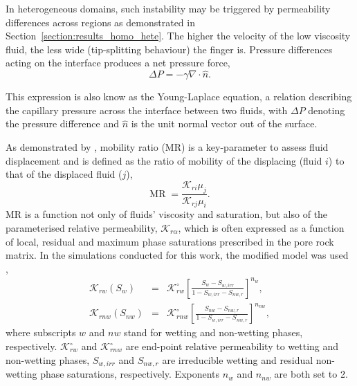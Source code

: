 \documentclass[preprint,authoryear,12pt]{elsarticle}
\newcommand{\frc}{\displaystyle\frac}
\begin{document}
\medskip 
In heterogeneous domains, such instability may be triggered by permeability differences across regions as demonstrated in Section~\ref{section:results_homo_hete}. The higher the velocity of the low viscosity fluid, the less wide (tip-splitting behaviour) the finger is. Pressure differences acting on the interface produces a net pressure force,      
\begin{equation} 
\Delta P= - \gamma \nabla\cdot\hat{n}. 
\label{eq:pressure_dif} 
\end{equation}

\noindent This expression is also know as the Young-Laplace equation, a relation describing the capillary pressure across the interface between two fluids, with $\Delta P$ denoting the pressure difference and $\hat{n}$ is the unit normal vector out of the surface. 

\medskip
As demonstrated by \citet{habermann_1960} \citep[see also][]{budek_2017}, mobility ratio (MR) is a key-parameter to assess fluid displacement and is defined as the ratio of mobility of the displacing (fluid $i$) to that of the displaced fluid ($j$),
\begin{equation}
 \text{MR} \; = \frac{\mathcal{K}_{ri} \mu_{j}}{\mathcal{K}_{rj} \mu_{i}}. 
\label{eq:MR}
\end{equation}
MR is a function not only of fluids' viscosity and saturation, but also of the parameterised relative permeability, $\mathcal{K}_{r\alpha}$, which is often expressed as a function of local, residual and maximum phase saturations prescribed in the pore rock matrix. In the simulations conducted for this work, the modified \cite{Brooks_1964} model was used \citep{alpak_1999},
\begin{eqnarray}
  \mathcal{K}_{rw}\left(S_{w}\right) &=& \mathcal{K}^{\circ}_{rw}\left[\frc{S_{w}-S_{w,irr}}{1-S_{w,irr}-S_{nw,r}}\right]^{n_{w}}, \label{Eqn:CoreyBrooks1}\\
  \mathcal{K}_{rnw}\left(S_{nw}\right) &=& \mathcal{K}^{\circ}_{rnw}\left[\frc{S_{nw}-S_{nw,r}}{1-S_{w,irr}-S_{nw,r}}\right]^{n_{nw}}, \label{Eqn:CoreyBrooks2}
\end{eqnarray}
where subscripts $w$ and $nw$ stand for wetting and non-wetting phases, respectively. $\mathcal{K}^{\circ}_{rw}$ and $\mathcal{K}^{\circ}_{rnw}$ are end-point relative permeability to wetting and non-wetting phases, $S_{w,irr}$ and $S_{nw,r}$ are irreducible wetting and residual non-wetting phase saturations, respectively. Exponents $n_{w}$ and $n_{nw}$ are both set to 2.
\end{document}
